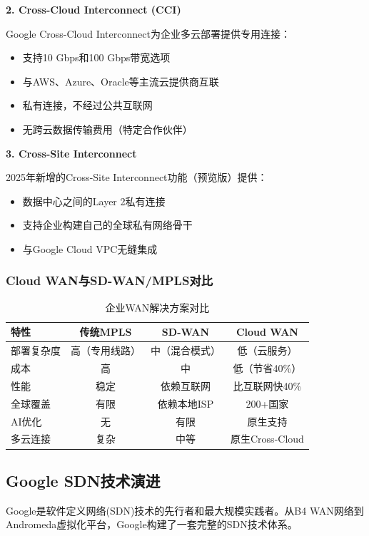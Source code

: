 \textbf{2. Cross-Cloud Interconnect (CCI)}

Google Cross-Cloud Interconnect为企业多云部署提供专用连接：
\begin{itemize}
    \item 支持10 Gbps和100 Gbps带宽选项
    \item 与AWS、Azure、Oracle等主流云提供商互联
    \item 私有连接，不经过公共互联网
    \item 无跨云数据传输费用（特定合作伙伴）
\end{itemize}

\textbf{3. Cross-Site Interconnect}

2025年新增的Cross-Site Interconnect功能（预览版）提供：
\begin{itemize}
    \item 数据中心之间的Layer 2私有连接
    \item 支持企业构建自己的全球私有网络骨干
    \item 与Google Cloud VPC无缝集成
\end{itemize}

\subsubsection{Cloud WAN与SD-WAN/MPLS对比}

\begin{table}[htbp]
\centering
\caption{企业WAN解决方案对比}
\begin{tabular}{|l|c|c|c|}
\hline
\textbf{特性} & \textbf{传统MPLS} & \textbf{SD-WAN} & \textbf{Cloud WAN} \\
\hline
部署复杂度 & 高（专用线路） & 中（混合模式） & 低（云服务） \\
成本 & 高 & 中 & 低（节省40\%） \\
性能 & 稳定 & 依赖互联网 & 比互联网快40\% \\
全球覆盖 & 有限 & 依赖本地ISP & 200+国家 \\
AI优化 & 无 & 有限 & 原生支持 \\
多云连接 & 复杂 & 中等 & 原生Cross-Cloud \\
\hline
\end{tabular}
\end{table}

\subsection{Google SDN技术演进}

Google是软件定义网络(SDN)技术的先行者和最大规模实践者。从B4 WAN网络到Andromeda虚拟化平台，Google构建了一套完整的SDN技术体系。

